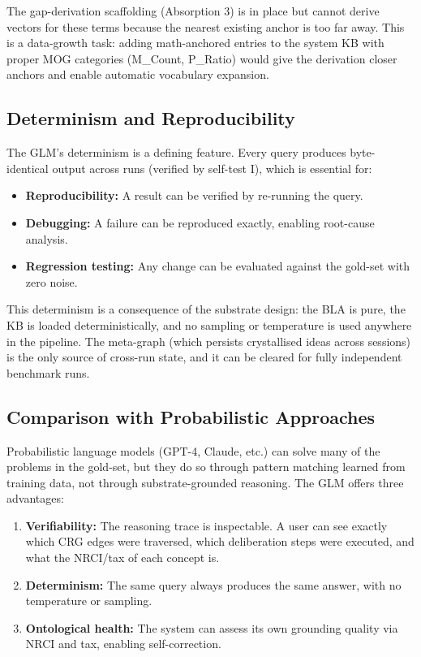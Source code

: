 \documentclass[11pt,a4paper]{article}
\begin{document}
The gap-derivation scaffolding (Absorption 3) is in place but cannot derive vectors for these terms because the nearest existing anchor is too far away. This is a data-growth task: adding math-anchored entries to the system KB with proper MOG categories (M\_Count, P\_Ratio) would give the derivation closer anchors and enable automatic vocabulary expansion.

\subsection{Determinism and Reproducibility}

The GLM's determinism is a defining feature. Every query produces byte-identical output across runs (verified by self-test I), which is essential for:
\begin{itemize}
    \item \textbf{Reproducibility:} A result can be verified by re-running the query.
    \item \textbf{Debugging:} A failure can be reproduced exactly, enabling root-cause analysis.
    \item \textbf{Regression testing:} Any change can be evaluated against the gold-set with zero noise.
\end{itemize}

This determinism is a consequence of the substrate design: the BLA is pure, the KB is loaded deterministically, and no sampling or temperature is used anywhere in the pipeline. The meta-graph (which persists crystallised ideas across sessions) is the only source of cross-run state, and it can be cleared for fully independent benchmark runs.

\subsection{Comparison with Probabilistic Approaches}

Probabilistic language models (GPT-4, Claude, etc.) can solve many of the problems in the gold-set, but they do so through pattern matching learned from training data, not through substrate-grounded reasoning. The GLM offers three advantages:

\begin{enumerate}
    \item \textbf{Verifiability:} The reasoning trace is inspectable. A user can see exactly which CRG edges were traversed, which deliberation steps were executed, and what the NRCI/tax of each concept is.
    \item \textbf{Determinism:} The same query always produces the same answer, with no temperature or sampling.
    \item \textbf{Ontological health:} The system can assess its own grounding quality via NRCI and tax, enabling self-correction.
\end{enumerate}
\end{document}
